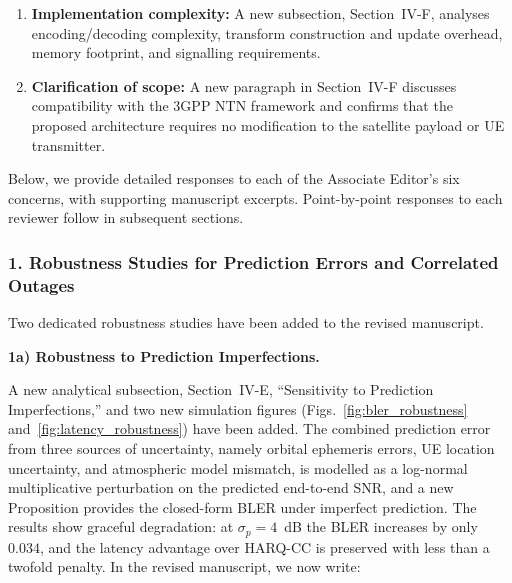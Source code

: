 \begin{enumerate}
\item \textbf{Implementation complexity:} A new subsection, Section~IV-F, analyses encoding/decoding complexity, transform construction and update overhead, memory footprint, and signalling requirements.

\item \textbf{Clarification of scope:} A new paragraph in Section~IV-F discusses compatibility with the 3GPP NTN framework and confirms that the proposed architecture requires no modification to the satellite payload or UE transmitter.
\end{enumerate}
Below, we provide detailed responses to each of the Associate Editor's six concerns, with supporting manuscript excerpts. Point-by-point responses to each reviewer follow in subsequent sections.

\subsubsection*{1. Robustness Studies for Prediction Errors and Correlated Outages}

Two dedicated robustness studies have been added to the revised manuscript.

\vskip 0.1in
\noindent\textbf{1a) Robustness to Prediction Imperfections.}

A new analytical subsection, Section~IV-E, ``Sensitivity to Prediction Imperfections,'' and two new simulation figures (Figs.~\ref{fig:bler_robustness} and~\ref{fig:latency_robustness}) have been added. The combined prediction error from three sources of uncertainty, namely orbital ephemeris errors, UE location uncertainty, and atmospheric model mismatch, is modelled as a log-normal multiplicative perturbation on the predicted end-to-end SNR, and a new Proposition provides the closed-form BLER under imperfect prediction. The results show graceful degradation: at $\sigma_p = 4$~dB the BLER increases by only $0.034$, and the latency advantage over HARQ-CC is preserved with less than a twofold penalty. In the revised manuscript, we now write:

